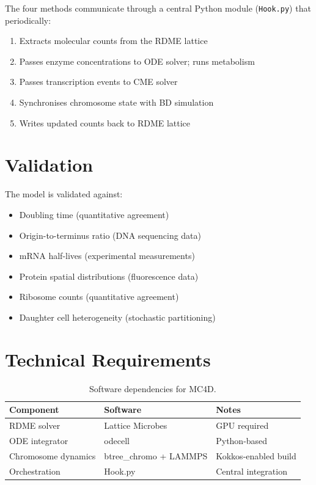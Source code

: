 \documentclass[11pt,a4paper]{report}
\begin{document}
The four methods communicate through a central Python module (\texttt{Hook.py}) that periodically:

\begin{enumerate}
    \item Extracts molecular counts from the RDME lattice
    \item Passes enzyme concentrations to ODE solver; runs metabolism
    \item Passes transcription events to CME solver
    \item Synchronises chromosome state with BD simulation
    \item Writes updated counts back to RDME lattice
\end{enumerate}

\section{Validation}

The model is validated against:

\begin{itemize}
    \item Doubling time (quantitative agreement)
    \item Origin-to-terminus ratio (DNA sequencing data)
    \item mRNA half-lives (experimental measurements)
    \item Protein spatial distributions (fluorescence data)
    \item Ribosome counts (quantitative agreement)
    \item Daughter cell heterogeneity (stochastic partitioning)
\end{itemize}

\section{Technical Requirements}

\begin{table}[h]
\centering
\begin{tabular}{lll}
\toprule
\textbf{Component} & \textbf{Software} & \textbf{Notes} \\
\midrule
RDME solver & Lattice Microbes & GPU required \\
ODE integrator & odecell & Python-based \\
Chromosome dynamics & btree\_chromo + LAMMPS & Kokkos-enabled build \\
Orchestration & Hook.py & Central integration \\
\bottomrule
\end{tabular}
\caption{Software dependencies for MC4D.}
\end{table}
\end{document}
